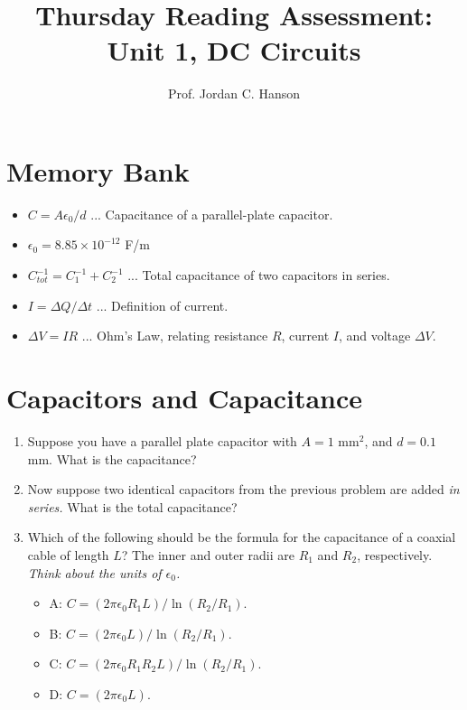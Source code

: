 \documentclass{article}
\begin{document}
\title{Thursday Reading Assessment: Unit 1, DC Circuits}
\author{Prof. Jordan C. Hanson}

\maketitle

\section{Memory Bank}

\begin{itemize}
\item $C = A\epsilon_0/d$ ... Capacitance of a parallel-plate capacitor.
\item $\epsilon_0 = 8.85 \times 10^{-12}$ F/m
\item $C_{tot}^{-1} = C_1^{-1} + C_2^{-1}$ ... Total capacitance of two capacitors in series.
\item $I = \Delta Q/\Delta t$ ... Definition of current.
\item $\Delta V = I R$ ... Ohm's Law, relating resistance $R$, current $I$, and voltage $\Delta V$.\end{itemize}

\section{Capacitors and Capacitance}

\begin{enumerate}
\item Suppose you have a parallel plate capacitor with $A = 1$ mm$^2$, and $d = 0.1$ mm.  What is the capacitance? \\ \vspace{0.5cm}
\item Now suppose two identical capacitors from the previous problem are added \textit{in series.}  What is the total capacitance? \\ \vspace{0.5cm}
\item Which of the following should be the formula for the capacitance of a coaxial cable of length $L$?  The inner and outer radii are $R_1$ and $R_2$, respectively.  \textit{Think about the units of $\epsilon_0$.}
\begin{itemize}
\item A: $C = (2\pi\epsilon_0 R_1 L)/\ln(R_2/R_1)$.
\item B: $C = (2\pi\epsilon_0 L)/\ln(R_2/R_1)$.
\item C: $C = (2\pi\epsilon_0 R_1 R_2 L)/\ln(R_2/R_1)$.
\item D: $C = (2\pi\epsilon_0 L)$.
\end{itemize}
\end{enumerate}
\end{document}
